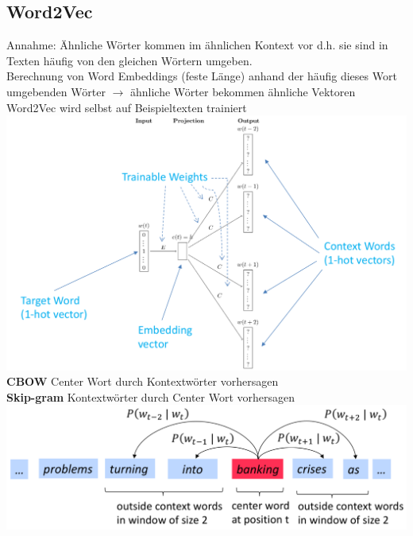 \documentclass[12pt]{article}
\begin{document}
	\subsection{Word2Vec}
	Annahme: Ähnliche Wörter kommen im ähnlichen Kontext vor d.h. sie sind in Texten häufig von den gleichen Wörtern umgeben.\\
	Berechnung von Word Embeddings (feste Länge) anhand der häufig dieses Wort umgebenden Wörter $\rightarrow$ ähnliche Wörter bekommen ähnliche Vektoren\\
	Word2Vec wird selbst auf Beispieltexten trainiert\\
	\includegraphics[width=\linewidth]{figures/word2vec-nn.png}\\
	\textbf{CBOW} Center Wort durch Kontextwörter vorhersagen\\
	\textbf{Skip-gram} Kontextwörter durch Center Wort vorhersagen\\
	\includegraphics[width=\linewidth]{figures/word2vec.png}
\end{document}
